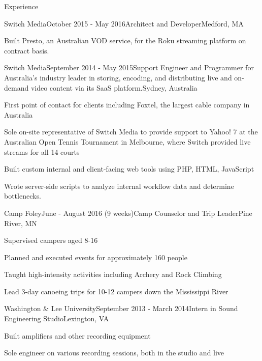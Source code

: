 \documentclass{resume}
\begin{document}
  \begin{rSection}{Experience}
  
    \begin{rSubsection}{Switch Media}{October 2015 - May 2016}{Architect and Developer}{Medford, MA}
    \item Built Presto, an Australian VOD service, for the Roku streaming platform on contract basis.
    \end{rSubsection}

    \begin{rSubsection}{Switch Media}{September 2014 - May 2015}{Support Engineer and Programmer for Australia's industry leader in storing, encoding, and distributing live and on-demand video content via its SaaS platform.}{Sydney, Australia}
    \item First point of contact for clients including Foxtel, the largest cable company in Australia
    \item Sole on-site representative of Switch Media to provide support to Yahoo! 7 at the Australian Open Tennis Tournament in Melbourne, where Switch provided live streams for all 14 courts
    \item Built custom internal and client-facing web tools using PHP, HTML, JavaScript
    \item Wrote server-side scripts to analyze internal workflow data and determine bottlenecks.
    \end{rSubsection}
  
    \begin{rSubsection}{Camp Foley}{June - August 2016 (9 weeks)}{Camp Counselor and Trip Leader}{Pine River, MN}
    \item Supervised campers aged 8-16
    \item Planned and executed events for approximately 160 people
    \item Taught high-intensity activities including Archery and Rock Climbing
    \item Lead 3-day canoeing trips for 10-12 campers down the Mississippi River
    \end{rSubsection}

    \begin{rSubsection}{Washington \& Lee University}{September 2013 - March 2014}{Intern in Sound Engineering Studio}{Lexington, VA}
    \item Built amplifiers and other recording equipment
    \item Sole engineer on various recording sessions, both in the studio and live
    \end{rSubsection}
  
  \end{rSection}
  
\end{document}
